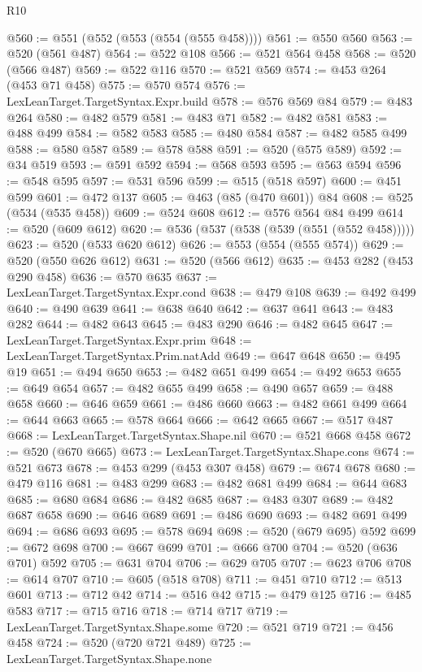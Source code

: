 \begin{lexlean}{R10}
\begin{coremodule}
{{{{{{{{{{{{{{{{{{{{{{{{{{{{{{{{{{{{{{{{{{{{{{{{{{{@560 := @551 (@552 (@553 (@554 (@555 @458))))
@561 := @550 @560
@563 := @520 (@561 @487)
@564 := @522 @108
@566 := @521 @564 @458
@568 := @520 (@566 @487)
@569 := @522 @116
@570 := @521 @569
@574 := @453 @264 (@453 @71 @458)
@575 := @570 @574
@576 := LexLeanTarget.TargetSyntax.Expr.build
@578 := @576 @569 @84
@579 := @483 @264
@580 := @482 @579
@581 := @483 @71
@582 := @482 @581
@583 := @488 @499
@584 := @582 @583
@585 := @480 @584
@587 := @482 @585 @499
@588 := @580 @587
@589 := @578 @588
@591 := @520 (@575 @589)
@592 := @34 @519
@593 := @591 @592
@594 := @568 @593
@595 := @563 @594
@596 := @548 @595
@597 := @531 @596
@599 := @515 (@518 @597)
@600 := @451 @599
@601 := @472 @137
@605 := @463 (@85 (@470 @601)) @84
@608 := @525 (@534 (@535 @458))
@609 := @524 @608
@612 := @576 @564 @84 @499
@614 := @520 (@609 @612)
@620 := @536 (@537 (@538 (@539 (@551 (@552 @458)))))
@623 := @520 (@533 @620 @612)
@626 := @553 (@554 (@555 @574))
@629 := @520 (@550 @626 @612)
@631 := @520 (@566 @612)
@635 := @453 @282 (@453 @290 @458)
@636 := @570 @635
@637 := LexLeanTarget.TargetSyntax.Expr.cond
@638 := @479 @108
@639 := @492 @499
@640 := @490 @639
@641 := @638 @640
@642 := @637 @641
@643 := @483 @282
@644 := @482 @643
@645 := @483 @290
@646 := @482 @645
@647 := LexLeanTarget.TargetSyntax.Expr.prim
@648 := LexLeanTarget.TargetSyntax.Prim.natAdd
@649 := @647 @648
@650 := @495 @19
@651 := @494 @650
@653 := @482 @651 @499
@654 := @492 @653
@655 := @649 @654
@657 := @482 @655 @499
@658 := @490 @657
@659 := @488 @658
@660 := @646 @659
@661 := @486 @660
@663 := @482 @661 @499
@664 := @644 @663
@665 := @578 @664
@666 := @642 @665
@667 := @517 @487
@668 := LexLeanTarget.TargetSyntax.Shape.nil
@670 := @521 @668 @458
@672 := @520 (@670 @665)
@673 := LexLeanTarget.TargetSyntax.Shape.cons
@674 := @521 @673
@678 := @453 @299 (@453 @307 @458)
@679 := @674 @678
@680 := @479 @116
@681 := @483 @299
@683 := @482 @681 @499
@684 := @644 @683
@685 := @680 @684
@686 := @482 @685
@687 := @483 @307
@689 := @482 @687 @658
@690 := @646 @689
@691 := @486 @690
@693 := @482 @691 @499
@694 := @686 @693
@695 := @578 @694
@698 := @520 (@679 @695) @592
@699 := @672 @698
@700 := @667 @699
@701 := @666 @700
@704 := @520 (@636 @701) @592
@705 := @631 @704
@706 := @629 @705
@707 := @623 @706
@708 := @614 @707
@710 := @605 (@518 @708)
@711 := @451 @710
@712 := @513 @601
@713 := @712 @42
@714 := @516 @42
@715 := @479 @125
@716 := @485 @583
@717 := @715 @716
@718 := @714 @717
@719 := LexLeanTarget.TargetSyntax.Shape.some
@720 := @521 @719
@721 := @456 @458
@724 := @520 (@720 @721 @489)
@725 := LexLeanTarget.TargetSyntax.Shape.none
}}}}}}}}}}}}}}}}}}}}}}}}}}}}}}}}}}}}}}}}}}}}}}}}}}}
\end{coremodule}
\end{lexlean}
